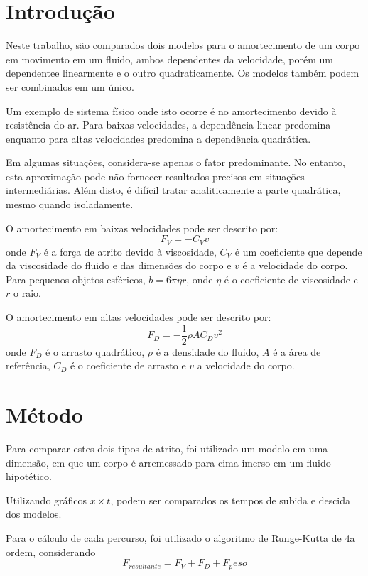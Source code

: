 \section{Introdução} 
Neste trabalho, são comparados dois modelos para o amortecimento de um corpo em movimento em um fluido, ambos dependentes da velocidade, porém um dependentee linearmente e o outro quadraticamente. Os modelos também podem ser combinados em um único.

Um exemplo de sistema físico onde isto ocorre é no amortecimento devido à resistência do ar. Para baixas velocidades, a dependência linear predomina enquanto para altas velocidades predomina a dependência quadrática.

Em algumas situações, considera-se apenas o fator predominante. No entanto, esta aproximação pode não fornecer resultados precisos em situações intermediárias. Além disto, é difícil tratar analiticamente a parte quadrática, mesmo quando isoladamente.

O amortecimento em baixas velocidades pode ser descrito por\cite{stokes_wiki}:
$$F_V=-C_V v$$
onde $F_V$ é a força de atrito devido à viscosidade, $C_V$ é um coeficiente que depende da viscosidade do fluido e das dimensões do corpo e $v$ é a velocidade do corpo. Para pequenos objetos esféricos, $b=6\pi \eta r$, onde $\eta$ é o coeficiente de viscosidade e $r$ o raio.

O amortecimento em altas velocidades pode ser descrito por\cite{drag1_wiki}:
$$F_D=-\frac{1}{2}\rho A C_D v^2$$
onde $F_D$ é o arrasto quadrático, $\rho$ é a densidade do fluido, $A$ é a área de referência, $C_D$ é o coeficiente de arrasto e $v$ a velocidade do corpo.

\section{Método}
Para comparar estes dois tipos de atrito, foi utilizado um modelo em uma dimensão, em que um corpo é arremessado para cima imerso em um fluido hipotético.

Utilizando gráficos $x\times t$, podem ser comparados os tempos de subida e descida dos modelos.

Para o cálculo de cada percurso, 
foi utilizado o algoritmo de Runge-Kutta de 4a ordem, considerando
$$F_{resultante}=F_V+F_D+F_peso$$

